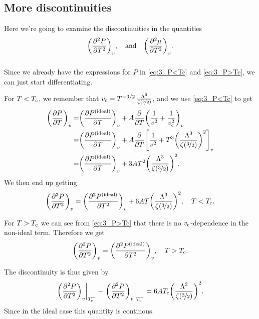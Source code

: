 \documentclass[11pt,letter, swedish, english
]{article}
\begin{document}
\subsection{More discontinuities}
Here we're going to examine the discontinuities in the quantities
\begin{equation}
\qty(\pdv[2]{P}{T})_v \qcomma\text{and}\quad
\qty(\pdv[2]{\mu}{T})_v.
\end{equation}

\subsubsection{}
Since we already have the expressions for $P$ in \eqref{eq:3_P<Tc} and
\eqref{eq:3_P>Tc}, we can just start differentiating.

For $T<T_{\text{c}}$, we remember that
$v_{\text{c}}=T^{-3/2}\,\frac{\Lambda^3}{\zeta(\nicefrac{3}{2})}$, and we use
\eqref{eq:3_P<Tc} to get
\begin{equation}
\begin{aligned}
\qty(\pdv{P}{T})_v=&\qty(\pdv{P^\text{{(ideal)}}}{T})_v
+A\pdv{T}\qty(\frac{1}{v^2}+\frac{1}{v_{\text{c}}^2})_v\\
=&\qty(\pdv{P^\text{{(ideal)}}}{T})_v
+A\pdv{T}\qty[\frac{1}{v^2}+T^3\qty(\frac{\Lambda^3}{\zeta(\nicefrac{3}{2})})^2]_v\\
=&\qty(\pdv{P^\text{{(ideal)}}}{T})_v
+3AT^2\qty(\frac{\Lambda^3}{\zeta(\nicefrac{3}{2})})^2.
\end{aligned}
\end{equation}
We then end up getting
\begin{equation}
\qty(\pdv[2]{P}{T})_v=\qty(\pdv[2]{\ideal{P}}{T})_v
+6AT\qty(\frac{\Lambda^3}{\zeta(\nicefrac{3}{2})})^2
\qcomma T<\Tc.
\end{equation}

For $T>T_{\text{c}}$ we can see from \eqref{eq:3_P>Tc} that there is no
$v_{\text{c}}$-dependence in the non-ideal term. Therefore we get
\begin{equation}
\qty(\pdv[2]{P}{T})_v=\qty(\pdv[2]{\ideal{P}}{T})_v
\qcomma T>\Tc.
\end{equation}

The discontinuity is thus given by
\begin{equation}\label{eq:3_discont._P}
\eval{\qty(\pdv[2]{P}{T})_v}_{\Tc^-}
-\eval{\qty(\pdv[2]{P}{T})_v}_{\Tc^+}
=6A\Tc\qty(\frac{\Lambda^3}{\zeta(\nicefrac{3}{2})})^2.
\end{equation}
Since in the ideal case this quantity is continous\footnotemark{}.
\end{document}
